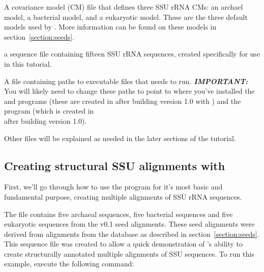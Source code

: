   \begin{sreitems}{}
  \item[\prog{ssu-align-0.1/seeds/ssu3-0p1.cm}] A covariance model (CM) file that
    defines three SSU rRNA CMs: an archael model, a bacterial model,
    and a eukaryotic model. These are the three default models used by
    . More information can be found on these models
    in section~\ref{section:seeds}.
  \item[\prog{ssu-align-0.1/tutorial/seed-15.fa}] a sequence file containing
    fifteen SSU rRNA sequences, created specifically for use in this tutorial.
  \item[\prog{ssu-align-0.1/sa-0p1.params}] A file containing paths to
     executable files that  needs
    to run. \textbf{\emph{IMPORTANT:}} You will likely need to change
    these paths to point to where you've installed the 
    and  programs (these are created in
     after building  version
    1.0 with ) and the 
    program (which is created in \\ 
    after building  version 1.0).
  \end{sreitems}

Other files will be explained as needed in the later sections of the tutorial.

\subsection{Creating structural SSU alignments with }

First, we'll go through how to use the program for
it's most basic and fundamental purpose, creating multiple
alignments of SSU rRNA sequences. 

The file  contains five archaeal sequences, five
bacterial sequences and five eukaryotic sequences from the
 v0.1 seed alignments. These seed alignments
were derived from alignments from the  database
\cite{CannoneGutell02} as described in section~\ref{section:seeds}.
This sequence file was created to allow a quick demonstration of
's ability to create structurally annotated multiple
alignments of SSU sequences. To run this example, 
execute the following command:

